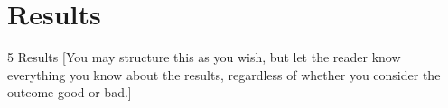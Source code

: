 \clearpage
\section{Results}

5 Results
[You may structure this as you wish, but let the reader know everything you know about the results,
regardless of whether you consider the outcome good or bad.]
